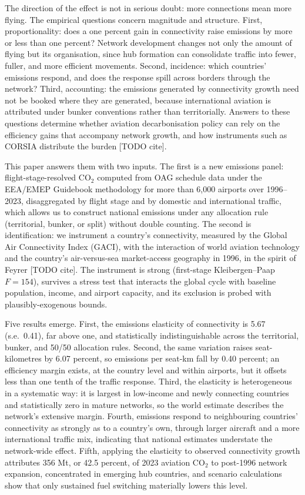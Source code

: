 \documentclass[12pt]{article}
\begin{document}
The direction of the effect is not in serious doubt: more connections mean
more flying. The empirical questions concern magnitude and structure. First,
proportionality: does a one percent gain in connectivity raise emissions by
more or less than one percent? Network development changes not only the
amount of flying but its organisation, since hub formation can consolidate
traffic into fewer, fuller, and more efficient movements. Second, incidence:
which countries' emissions respond, and does the response spill across
borders through the network? Third, accounting: the emissions generated by
connectivity growth need not be booked where they are generated, because
international aviation is attributed under bunker conventions rather than
territorially. Answers to these questions determine whether aviation
decarbonisation policy can rely on the efficiency gains that accompany
network growth, and how instruments such as CORSIA distribute the burden
[TODO cite].

This paper answers them with two inputs. The first is a new emissions panel:
flight-stage-resolved CO$_2$ computed from OAG schedule data under the
EEA/EMEP Guidebook methodology for more than 6{,}000 airports over
1996--2023, disaggregated by flight stage and by domestic and international
traffic, which allows us to construct national emissions under any
allocation rule (territorial, bunker, or split) without double counting. The
second is identification: we instrument a country's connectivity, measured
by the Global Air Connectivity Index (GACI), with the interaction of world
aviation technology and the country's air-versus-sea market-access geography
in 1996, in the spirit of Feyrer [TODO cite]. The instrument is strong
(first-stage Kleibergen--Paap $F = 154$), survives a stress test that
interacts the global cycle with baseline population, income, and airport
capacity, and its exclusion is probed with plausibly-exogenous bounds.

Five results emerge. First, the emissions elasticity of connectivity is
5.67 (s.e.\ 0.41), far above one, and statistically indistinguishable across
the territorial, bunker, and 50/50 allocation rules. Second, the same
variation raises seat-kilometres by 6.07 percent, so emissions per seat-km
fall by 0.40 percent; an efficiency margin exists, at the country level and
within airports, but it offsets less than one tenth of the traffic response.
Third, the elasticity is heterogeneous in a systematic way: it is largest in
low-income and newly connecting countries and statistically zero in mature
networks, so the world estimate describes the network's extensive margin.
Fourth, emissions respond to neighbouring countries' connectivity as
strongly as to a country's own, through larger aircraft and a more
international traffic mix, indicating that national estimates understate the
network-wide effect. Fifth, applying the elasticity to observed connectivity
growth attributes 356 Mt, or 42.5 percent, of 2023 aviation CO$_2$ to
post-1996 network expansion, concentrated in emerging hub countries, and
scenario calculations show that only sustained fuel switching materially
lowers this level.
\end{document}
